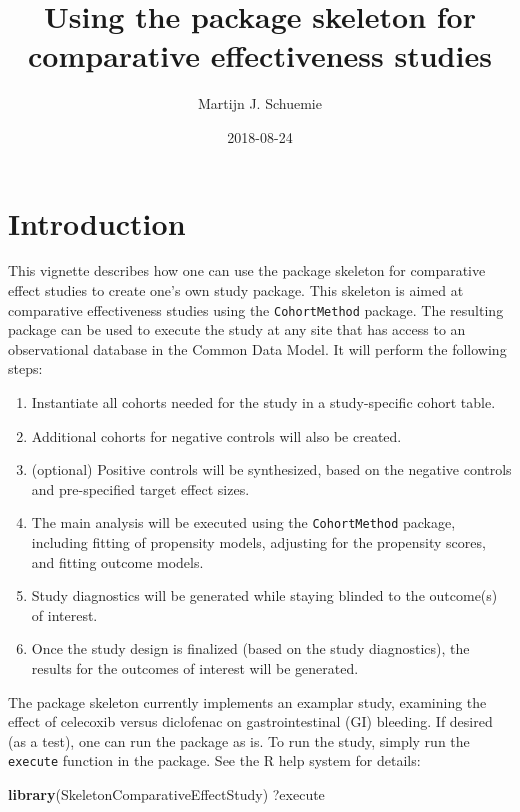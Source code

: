 \documentclass[]{article}
\title{Using the package skeleton for comparative effectiveness studies}
\author{Martijn J. Schuemie}
\date{2018-08-24}
\newenvironment{Shaded}{\begin{snugshade}}{\end{snugshade}}
\newcommand{\KeywordTok}[1]{\textcolor[rgb]{0.13,0.29,0.53}{\textbf{#1}}}
\newcommand{\NormalTok}[1]{#1}
\providecommand{\tightlist}{%
  \setlength{\itemsep}{0pt}\setlength{\parskip}{0pt}}
\begin{document}
\maketitle

{
\setcounter{tocdepth}{2}
\tableofcontents
}
\hypertarget{introduction}{%
\section{Introduction}\label{introduction}}

This vignette describes how one can use the package skeleton for
comparative effect studies to create one's own study package. This
skeleton is aimed at comparative effectiveness studies using the
\texttt{CohortMethod} package. The resulting package can be used to
execute the study at any site that has access to an observational
database in the Common Data Model. It will perform the following steps:

\begin{enumerate}
\def\labelenumi{\arabic{enumi}.}
\tightlist
\item
  Instantiate all cohorts needed for the study in a study-specific
  cohort table.
\item
  Additional cohorts for negative controls will also be created.
\item
  (optional) Positive controls will be synthesized, based on the
  negative controls and pre-specified target effect sizes.
\item
  The main analysis will be executed using the \texttt{CohortMethod}
  package, including fitting of propensity models, adjusting for the
  propensity scores, and fitting outcome models.
\item
  Study diagnostics will be generated while staying blinded to the
  outcome(s) of interest.
\item
  Once the study design is finalized (based on the study diagnostics),
  the results for the outcomes of interest will be generated.
\end{enumerate}

The package skeleton currently implements an examplar study, examining
the effect of celecoxib versus diclofenac on gastrointestinal (GI)
bleeding. If desired (as a test), one can run the package as is. To run
the study, simply run the \texttt{execute} function in the package. See
the R help system for details:

\begin{Shaded}
\begin{Highlighting}[]
\KeywordTok{library}\NormalTok{(SkeletonComparativeEffectStudy)}
\NormalTok{?execute}
\end{Highlighting}
\end{Shaded}
\end{document}
